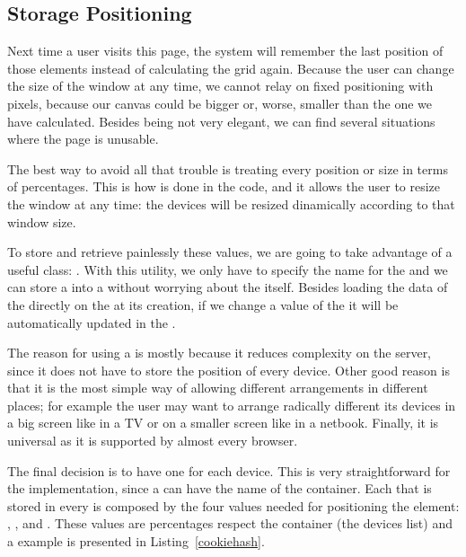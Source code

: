 
\subsection{Storage Positioning} %
\label{sub:storage}

Next time a user visits this page, the system will remember the last position of those elements instead of calculating the grid again.
Because the user can change the size of the window at any time, we cannot relay on fixed positioning with pixels, because our canvas could be bigger or, worse, smaller than the one we have calculated.
Besides being not very elegant, we can find several situations where the page is unusable.

The best way to avoid all that trouble is treating every position or size in terms of percentages.
This is how is done in the code, and it allows the user to resize the window at any time: the devices will be resized dinamically according to that window size.

To store and retrieve painlessly these values, we are going to take advantage of a useful  class:  \cite{MooHashCookie}.
With this utility, we only have to specify the name for the  and we can store a  into a  without worrying about the  itself.
Besides loading the data of the  directly on the  at its creation, if we change a value of the  it will be automatically updated in the .

The reason for using a  is mostly because it reduces complexity on the server, since it does not have to store the position of every device.
Other good reason is that it is the most simple way of allowing different arrangements in different places; for example the user may want to arrange radically different its devices in a big screen like in a TV or on a smaller screen like in a netbook.
Finally, it is universal as it is supported by almost every browser.

The final decision is to have one  for each device.
This is very straightforward for the implementation, since a  can
have the name of the container.
Each  that is stored in every  is composed by the four
values needed for positioning the element: , ,
 and .
These values are percentages respect the container (the devices list) and a
 example is presented in Listing~\ref{cookiehash}.

